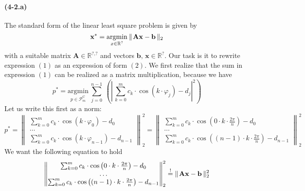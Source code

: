 \documentclass{article}
\begin{document}
\paragraph{(4-2.a)} The standard form of the linear least square problem is given by
\begin{equation}
    \mathbf{x}^{*} = \underset{x \in \mathbb{R}^{?}}{\text{argmin}} \: \lVert \hspace{1px} \mathbf{A}\mathbf{x} - \mathbf{b} \,\rVert_{2}
\end{equation}
with a suitable matrix $\mathbf{A} \in \mathbb{R}^{?\text{,}?}$ and vectors $\mathbf{b} \text{, } \mathbf{x} \in \mathbb{R}^{?}$. Our task is it to rewrite expression $\left(1\right)$ as an expression of form $\left(2\right)$. \vspace{2ex}
\noindent We first realize that the sum in expression $\left(1\right)$ can be realized as a matrix multiplication, because we have
\begin{equation*}
    p^{*} = \underset{p \in \mathcal{P}^{\mathrm{C}}_{m}}{\text{argmin}} \: \sum_{j=0}^{n-1} \: \left(\left\lvert \, \sum_{k = 0}^{m}c_{k}\cdot\cos\left(k\cdot\varphi_{j}\right) - d_{j}\right\rvert^{2} \right)
\end{equation*}
\pagebreak
Let us write this first as a norm:
\begin{equation*}
    p^{*} = 
    \left\lVert
    \begin{matrix}
    \sum_{k = 0}^{m}c_{k} \cdot \cos\left(k \cdot \varphi_{0}\right) - d_{0} \\
    \dots
    \\
    \sum_{k = 0}^{m}c_{k} \cdot \cos\left(k \cdot \varphi_{n - 1}\right) - d_{n-1}
    \end{matrix}
    \right\rVert_{2}^{2} = 
    \left\lVert
    \begin{matrix}
    \sum_{k = 0}^{m}c_{k} \cdot \cos\left(0\cdot k \cdot \frac{2\pi}{n}\right) - d_{0} \\
    \dots
    \\
    \sum_{k = 0}^{m}c_{k} \cdot \cos\left(\left(n-1\right) \cdot k \cdot \frac{2\pi}{n}\right) - d_{n-1}
    \end{matrix}
    \right\rVert_{2}^{2}
\end{equation*}
We want the following equation to hold
\begin{equation*}
    \left\lVert
    \begin{matrix}
    \sum_{k = 0}^{m}c_{k} \cdot \cos\left(0\cdot k \cdot \frac{2\pi}{n}\right) - d_{0} \\
    \dots
    \\
    \sum_{k = 0}^{m}c_{k} \cdot \cos\left(\left(n-1\right) \cdot k \cdot \frac{2\pi}{n}\right) - d_{n-1}
    \end{matrix}
    \right\rVert_{2}^{2} \overset{!}{=} 
    \lVert \hspace{1px} \mathbf{A}\mathbf{x} - \mathbf{b} \,\rVert_{2}^{2}
\end{equation*}
\end{document}
